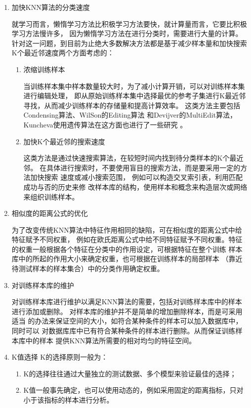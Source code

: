 \documentclass[12pt]{article}
\begin{document}
\begin{enumerate}
  \item 加快KNN算法的分类速度

        就学习而言，懒惰学习方法比积极学习方法要快，就计算量而言，它要比积极学习方法慢许多，
        因为懒惰学习方法在进行分类时，需要进行大量的计算。针对这一问题，到目前为止绝大多数解决方法都是基于减少样本量和加快搜索
        K个最近邻速度两个方面考虑的：
        \begin{enumerate}
          \item 浓缩训练样本

                当训练样本集中样本数量较大时，为了减小计算开销，可以对训练样本集进行编辑处理，
                即从原始训练样本集中选择最优的参考子集进行K最近邻寻找，从而减少训练样本的存储量和提高计算效率。
                这类方法主要包括Condensing算法、WilSon的Editing算法 和Devijver的MultiEdit算法，
                Kuncheva使用遗传算法在这方面也进行了一些研究  。

          \item 加快K个最近邻的搜索速度

                这类方法是通过快速搜索算法，在较短时间内找到待分类样本的K个最近邻。
                在具体进行搜索时，不要使用盲目的搜索方法，而是要采用一定的方法加快搜索 速度或减小搜索范围，
                例如可以构造交叉索引表，利用匹配成功与否的历史来修 改样本库的结构，使用样本和概念来构造层次或网络来组织训练样本。

        \end{enumerate}
  \item 相似度的距离公式的优化

        为了改变传统KNN算法中特征作用相同的缺陷，可在相似度的距离公式中给 特征赋予不同权重，
        例如在欧氏距离公式中给不同特征赋予不同权重。特征的权重一般根据各个特征在分类中的作用设定，可根据特征在整个训练 样本库中的所起的作用大小来确定权重，也可根据在训练样本的局部样本 （靠近待测试样本的样本集合）中的分类作用确定权重。


  \item 对训练样本库的维护

        对训练样本库进行维护以满足KNN算法的需要，包括对训练样本库中的样本 进行添加或删除。
        对样本库的维护并不是简单的增加删除样本，而是可采用适当 的办法来保证空间的大小，如符合某种条件的样本可以加入数据库中，
        同时可以 对数据库库中已有符合某种条件的样本进行删除。从而保证训练样本库中的样本 提供KNN算法所需要的相对均匀的特征空间。
  \item K值选择 K的选择原则一般为：
        \begin{enumerate}
          \item K的选择往往通过大量独立的测试数据、多个模型来验证最佳的选择；
          \item K值一般事先确定，也可以使用动态的，例如采用固定的距离指标，只对小于该指标的样本进行分析。
        \end{enumerate}
\end{enumerate}
\end{document}
